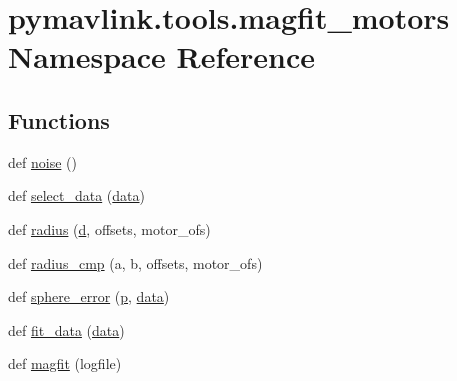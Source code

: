 \hypertarget{namespacepymavlink_1_1tools_1_1magfit__motors}{}\section{pymavlink.\+tools.\+magfit\+\_\+motors Namespace Reference}
\label{namespacepymavlink_1_1tools_1_1magfit__motors}
\subsection*{Functions}
\begin{DoxyCompactItemize}
\item 
def \mbox{\hyperlink{namespacepymavlink_1_1tools_1_1magfit__motors_a976924d27c33f71974f3d7c70674cf82}{noise}} ()
\item 
def \mbox{\hyperlink{namespacepymavlink_1_1tools_1_1magfit__motors_a6cf3772c22bd040df003057b8e5ae68d}{select\+\_\+data}} (\mbox{\hyperlink{structdata}{data}})
\item 
def \mbox{\hyperlink{namespacepymavlink_1_1tools_1_1magfit__motors_a7251ec199a4f359bc17d4a45827cfd58}{radius}} (\mbox{\hyperlink{velTest_8cpp_a76cd2b15a7b8954fcf0e73d5732e8e59}{d}}, offsets, motor\+\_\+ofs)
\item 
def \mbox{\hyperlink{namespacepymavlink_1_1tools_1_1magfit__motors_aa6e80f814cf0800c2263a28e37fc849f}{radius\+\_\+cmp}} (a, b, offsets, motor\+\_\+ofs)
\item 
def \mbox{\hyperlink{namespacepymavlink_1_1tools_1_1magfit__motors_a37869b2a7af3e558569774e7940444e2}{sphere\+\_\+error}} (\mbox{\hyperlink{velTest_8cpp_a739e18b8b6d072d434ebcb6ca486abb0}{p}}, \mbox{\hyperlink{structdata}{data}})
\item 
def \mbox{\hyperlink{namespacepymavlink_1_1tools_1_1magfit__motors_a894c345a3e835d40e605b38f7cd62db7}{fit\+\_\+data}} (\mbox{\hyperlink{structdata}{data}})
\item 
def \mbox{\hyperlink{namespacepymavlink_1_1tools_1_1magfit__motors_a77e8faeadc7b37710f2d336d744e6492}{magfit}} (logfile)
\end{DoxyCompactItemize}
